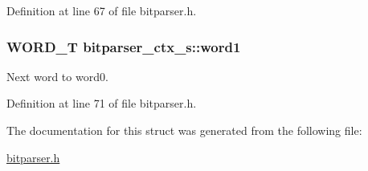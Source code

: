 Definition at line 67 of file bitparser.\+h.

\subsubsection[{\texorpdfstring{word1}{word1}}]{\setlength{\rightskip}{0pt plus 5cm}W\+O\+R\+D\+\_\+T bitparser\+\_\+ctx\+\_\+s\+::word1}\hypertarget{structbitparser__ctx__s_adfd90745c2f12b900e60162c6602c222}{}\label{structbitparser__ctx__s_adfd90745c2f12b900e60162c6602c222}
Next word to \textquotesingle{}word0\textquotesingle{}. 

Definition at line 71 of file bitparser.\+h.



The documentation for this struct was generated from the following file\+:\begin{DoxyCompactItemize}
\item 
\hyperlink{bitparser_8h}{bitparser.\+h}\end{DoxyCompactItemize}
